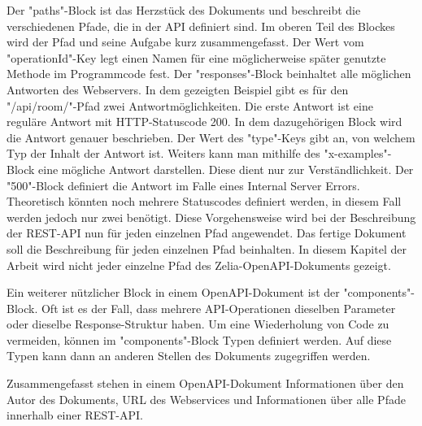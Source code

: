 Der "paths"-Block ist das Herzstück des Dokuments und beschreibt die verschiedenen Pfade, die in der API definiert sind. Im oberen Teil des Blockes wird der Pfad und seine Aufgabe kurz zusammengefasst. Der Wert vom "operationId"-Key legt einen Namen für eine möglicherweise später genutzte Methode im Programmcode fest. Der "responses"-Block beinhaltet alle möglichen Antworten des Webservers. In dem gezeigten Beispiel gibt es für den "/api/room/"-Pfad zwei Antwortmöglichkeiten. Die erste Antwort ist eine reguläre Antwort mit HTTP-Statuscode 200. In dem dazugehörigen Block wird die Antwort genauer beschrieben. Der Wert des "type"-Keys gibt an, von welchem Typ der Inhalt der Antwort ist. Weiters kann man mithilfe des "x-examples"-Block eine mögliche Antwort darstellen. Diese dient nur zur Verständlichkeit. Der "500"-Block definiert die Antwort im Falle eines Internal Server Errors. Theoretisch könnten noch mehrere Statuscodes definiert werden, in diesem Fall werden jedoch nur zwei benötigt. Diese Vorgehensweise wird bei der Beschreibung der REST-API nun für jeden einzelnen Pfad angewendet. Das fertige Dokument soll die Beschreibung für jeden einzelnen Pfad beinhalten. In diesem Kapitel der Arbeit wird nicht jeder einzelne Pfad des Zelia-OpenAPI-Dokuments gezeigt.


Ein weiterer nützlicher Block in einem OpenAPI-Dokument ist der "components"-Block. Oft ist es der Fall, dass mehrere API-Operationen dieselben Parameter oder dieselbe Response-Struktur haben. Um eine Wiederholung von Code zu vermeiden, können im "components"-Block Typen definiert werden. Auf diese Typen kann dann an anderen Stellen des Dokuments zugegriffen werden. 

Zusammengefasst stehen in einem OpenAPI-Dokument Informationen über den Autor des Dokuments, URL des Webservices und Informationen über alle Pfade innerhalb einer REST-API. 

